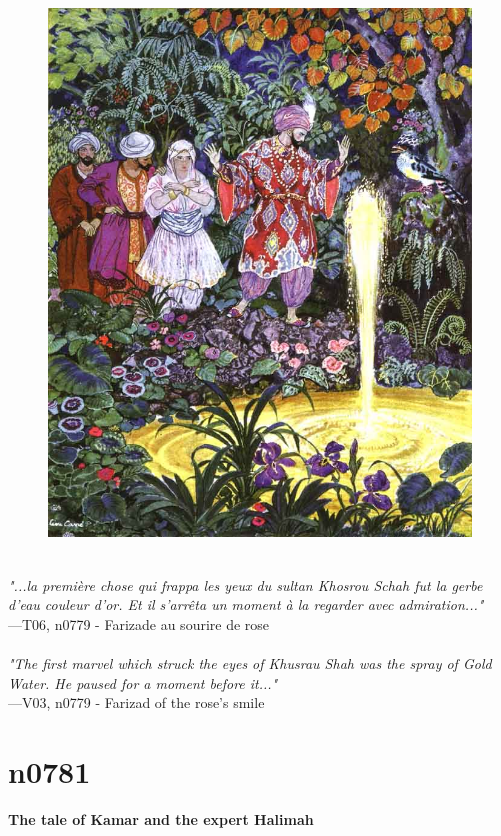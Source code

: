 \documentclass[../Carre_nights.tex]{subfiles}
\begin{document}
\begin{figure}[ht]
\centering
\includegraphics[height=\figsize]{illustrations/volume_6/T06, n0779 - Farizade au sourire de rose.jpg}
\end{figure}

\textit{\\
"...la première chose qui frappa les yeux du sultan Khosrou Schah fut la gerbe d’eau couleur d’or. Et il s’arrêta un moment à la regarder avec admiration..."} \\
—T06, n0779 - Farizade au sourire de rose \\~\\
\textit{"The first marvel which struck the eyes of Khusrau Shah was the spray of Gold Water. He paused for a moment before it..."} \\
—V03, n0779 - Farizad of the rose’s smile

\newpage

\section{n0781}
\textbf{\Large{The tale of Kamar and the expert Halimah}} \\
\end{document}
